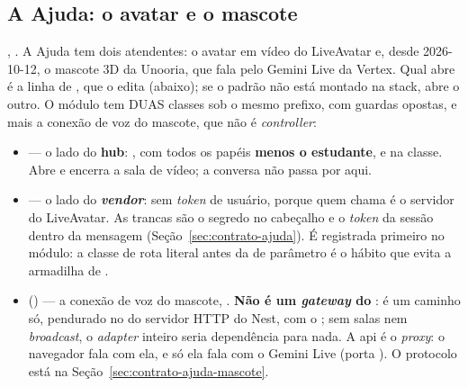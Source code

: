 \subsection{A Ajuda: o avatar e o mascote}
\label{sec:api-ajuda}

, . A Ajuda tem dois atendentes: o avatar em vídeo do
LiveAvatar e, desde 2026-10-12, o mascote 3D da Unooria, que fala pelo Gemini
Live da Vertex. Qual abre é a linha de , que o
 edita (abaixo); se o padrão não está montado na stack, abre o outro.
O módulo  tem DUAS classes sob o mesmo prefixo, com guardas
opostas, e mais a conexão de voz do mascote, que não é \emph{controller}:

\begin{itemize}
  \item {} --- o lado do \textbf{hub}: ,
     com todos os papéis \textbf{menos o estudante},
     e  na classe. Abre e
    encerra a sala de vídeo; a conversa não passa por aqui.
  \item {} --- o lado do \textbf{\emph{vendor}}: sem
    \emph{token} de usuário, porque quem chama é o servidor do LiveAvatar. As
    trancas são o segredo no cabeçalho e o \emph{token} da sessão dentro da
    mensagem  (Seção~\ref{sec:contrato-ajuda}). É registrada
    primeiro no módulo: a classe de rota literal antes da de parâmetro é o
    hábito que evita a armadilha de .
  \item {} () --- a conexão de voz
    do mascote, . \textbf{Não é um
    \emph{gateway} do }: é um caminho só, pendurado no
     do servidor HTTP do Nest, com o ; sem salas nem
    \emph{broadcast}, o \emph{adapter} inteiro seria dependência para nada. A
    api é o \emph{proxy}: o navegador fala com ela, e só ela fala com o Gemini
    Live (porta ). O protocolo está na
    Seção~\ref{sec:contrato-ajuda-mascote}.
\end{itemize}

